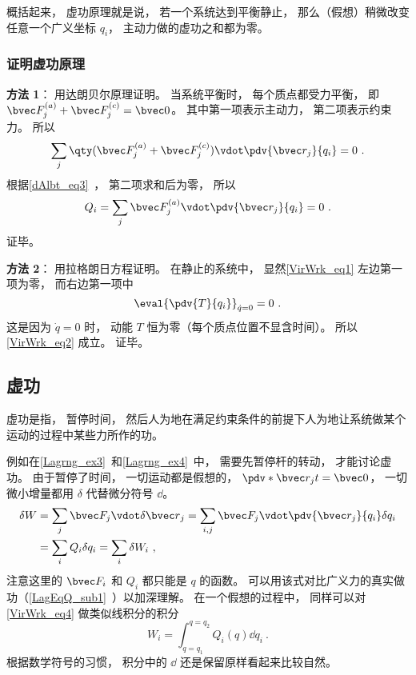 概括起来， 虚功原理就是说， 若一个系统达到平衡静止， 那么（假想）稍微改变任意一个广义坐标 $q_i$， 主动力做的虚功之和都为零。

\subsubsection{证明虚功原理}
\textbf{方法 1}： 用达朗贝尔原理证明。 当系统平衡时， 每个质点都受力平衡， 即 $\bvec F_j^{(a)}+\bvec F_j^{(c)} = \bvec 0$。 其中第一项表示主动力，  第二项表示约束力。 所以
\begin{equation}
\sum_j \qty(\bvec F_j^{(a)}+\bvec F_j^{(c)}) \vdot \pdv{\bvec r_j}{q_i} = 0~.
\end{equation}
根据\autoref{dAlbt_eq3}~， 第二项求和后为零， 所以
\begin{equation}
Q_i = \sum_j \bvec F_j^{(a)} \vdot \pdv{\bvec r_j}{q_i} = 0~.
\end{equation}
证毕。

\textbf{方法 2}： 用拉格朗日方程证明。 在静止的系统中， 显然\autoref{VirWrk_eq1} 左边第一项为零， 而右边第一项中
\begin{equation}
\eval{\pdv{T}{q_i}}_{\dot q = 0} = 0~.
\end{equation}
这是因为 $\dot q = 0$ 时， 动能 $T$ 恒为零（每个质点位置不显含时间）。 所以\autoref{VirWrk_eq2} 成立。 证毕。

\subsection{虚功}\label{VirWrk_sub1}
虚功是指， 暂停时间， 然后人为地在满足约束条件的前提下人为地让系统做某个运动的过程中某些力所作的功。

例如在\autoref{Lagrng_ex3}~和\autoref{Lagrng_ex4}~中， 需要先暂停杆的转动， 才能讨论虚功。 由于暂停了时间， 一切运动都是假想的， $\pdv*{\bvec r_j}{t} = \bvec 0$， 一切微小增量都用 $\delta$ 代替微分符号 $\dd{}$。
\begin{equation}\label{VirWrk_eq4}
\begin{aligned}
\delta{W} &= \sum_j \bvec F_j \vdot \delta{\bvec r}_j
= \sum_{i,j} \bvec F_j \vdot \pdv{\bvec r_j}{q_i}\delta q_i\\
&= \sum_i Q_i \delta q_i = \sum_i \delta{W_i}~,
\end{aligned}
\end{equation}
注意这里的 $\bvec F_i$ 和 $Q_i$ 都只能是 $q$ 的函数。 可以用该式对比广义力的真实做功（\autoref{LagEqQ_sub1}~）以加深理解。 在一个假想的过程中， 同样可以对\autoref{VirWrk_eq4} 做类似线积分的积分
\begin{equation}
W_i = \int_{q=q_1}^{q=q_2} Q_i(q) \dd q_i~.
\end{equation}
根据数学符号的习惯， 积分中的 $\dd{}$ 还是保留原样看起来比较自然。
